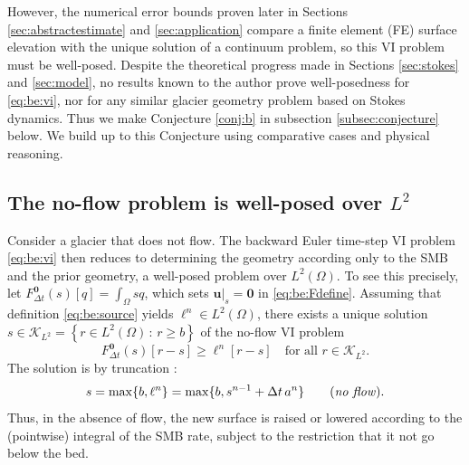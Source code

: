 \documentclass[hidelinks,onefignum,onetabnum,final]{siamart220329}  %
\newcommand{\bu}{\mathbf{u}}
\newcommand{\bzero}{\bm{0}}
\newcommand{\cK}{\mathcal{K}}
\begin{document}
However, the numerical error bounds proven later in Sections \ref{sec:abstractestimate} and \ref{sec:application} compare a finite element (FE) surface elevation with the unique solution of a continuum problem, so this VI problem must be well-posed.  Despite the theoretical progress made in Sections \ref{sec:stokes} and \ref{sec:model}, no results known to the author prove well-posedness for \eqref{eq:be:vi}, nor for any similar glacier geometry problem based on Stokes dynamics.  Thus we make Conjecture \ref{conj:b} in subsection \ref{subsec:conjecture} below.  We build up to this Conjecture using comparative cases and physical reasoning.

\subsection{The no-flow problem is well-posed over $L^2$} \label{subsec:noflow}   Consider a glacier that does not flow.  The backward Euler time-step VI problem \eqref{eq:be:vi} then reduces to determining the geometry according only to the SMB and the prior geometry, a well-posed problem over $L^2(\Omega)$.  To see this precisely, let $F^{\bzero}_{\Delta t}(s)[q] = \int_\Omega sq$, which sets $\bu|_s=\bzero$ in \eqref{eq:be:Fdefine}.  Assuming that definition \eqref{eq:be:source} yields $\ell^n \in L^2(\Omega)$, there exists a unique solution $s \in \cK_{L^2} = \left\{r\in L^2(\Omega)\,:\,r \ge b\right\}$ of the no-flow VI problem
\begin{equation}
F^{\bzero}_{\Delta t}(s)[r-s] \ge \ell^n[r-s] \quad \text{for all } r \in \cK_{L^2}.
\end{equation}
The solution is by truncation \cite[section II.3]{KinderlehrerStampacchia1980}:
\begin{equation}
s = \max\{b, \ell^n\} = \max\{b, s^{n-1} + \Delta t\,a^n\} \qquad (\text{\emph{no flow}}).
\end{equation}
Thus, in the absence of flow, the new surface is raised or lowered according to the (pointwise) integral of the SMB rate, subject to the restriction that it not go below the bed.
\end{document}
